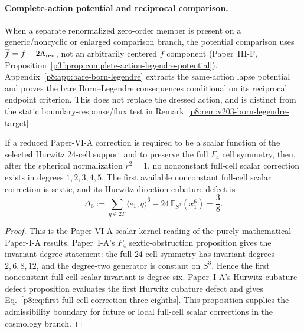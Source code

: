\documentclass[12pt,a4paper]{article}
\begin{document}
\paragraph{Complete-action potential and reciprocal comparison.}
When a separate renormalized zero-order member is present on a generic/noncyclic or enlarged comparison branch, the potential
comparison uses \(\overline f=f-2\Lambda_{\rm ren}\), not an arbitrarily
centered \(f\) component (Paper~III-F,
Proposition~\ref{p3f:prop:complete-action-legendre-potential}).
Appendix~\ref{p8:app:bare-born-legendre} extracts the same-action lapse
potential and proves the bare Born--Legendre consequences conditional on
its reciprocal endpoint criterion. This does not replace the dressed action,
and is distinct from the static boundary-response/flux test in
Remark~\ref{p8:rem:v203-born-legendre-target}.


\begin{proposition}
\label{p8:prop:first-full-cell-cosmology-correction}
If a reduced Paper-VI-A correction is required to be a scalar function of the selected Hurwitz $24$-cell support and to preserve the full $F_4$ cell symmetry, then, after the spherical normalization $r^2=1$, no nonconstant full-cell scalar correction exists in degrees $1,2,3,4,5$.  The first available nonconstant full-cell scalar correction is sextic, and its Hurwitz-direction cubature defect is
\begin{equation}
\label{p8:eq:first-full-cell-correction-three-eighths}
    \Delta_6
    :=
    \sum_{q\in2T}\langle e_1,q\rangle^6
    -24\,\mathbb E_{S^3}(x_1^6)
    =\frac38 .
\end{equation}
\end{proposition}

\begin{proof}
This is the Paper-VI-A scalar-kernel reading of the purely mathematical Paper-I-A results.  Paper~I-A's $F_4$ sextic-obstruction proposition gives the invariant-degree statement: the full $24$-cell symmetry has invariant degrees $2,6,8,12$, and the degree-two generator is constant on $S^3$.  Hence the first nonconstant full-cell scalar invariant is degree six.  Paper~I-A's Hurwitz-cubature defect proposition evaluates the first Hurwitz cubature defect and gives Eq.~\eqref{p8:eq:first-full-cell-correction-three-eighths}.  This proposition supplies the admissibility boundary for future or local full-cell scalar corrections in the cosmology branch.
\end{proof}
\end{document}
